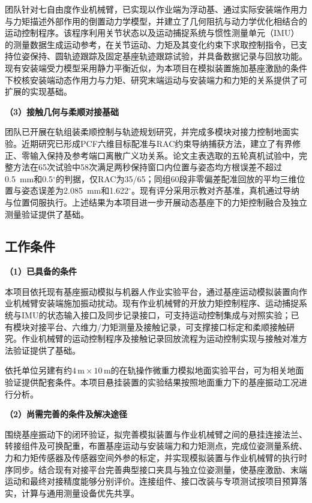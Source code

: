 \documentclass[UTF8,a4paper,zihao=-4,fontset=fandol]{ctexart}
\newcommand{\topic}[1]{\par\addvspace{0.5em}\noindent\textbf{#1}\par\nobreak}
\begin{document}
团队针对七自由度作业机械臂，已实现以作业端为浮动基、通过实际安装端作用力与力矩描述外部作用的倒置动力学模型，并建立了几何阻抗与动力学优化相结合的运动控制程序。该程序利用关节状态以及运动捕捉系统与惯性测量单元（IMU）的测量数据生成运动参考，在关节运动、力矩及其变化约束下求取控制指令，已支持位姿保持、圆轨迹跟踪及固定基座轨迹跟踪试验，并具备数据记录与回放功能。现有安装端受力模型采用静力平衡近似，为本项目在模拟装置施加基座激励的条件下校核安装端动态作用力与力矩、研究末端运动与安装端力和力矩的关系提供了可扩展的实现基础。



\topic{（3）接触几何与柔顺对接基础}

团队已开展在轨组装柔顺控制与轨迹规划研究，并完成多模块对接力控制地面实验\cite{shi2024}。近期研究已形成PCF六维目标配准与RAC约束导纳捕获方法，建立了有界修正、零输入保持及参考端口离散广义功关系。论文主表选取的五轮真机试验中，完整方法在65次试验中58次满足两秒保持窗口内位置与姿态均方根误差不超过0.5~mm和0.5$^\circ$的判据，仅RAC为35/65；同组60段非零偏差配准回放的平均三维位置与姿态误差为2.085~mm和1.622$^\circ$。现有评分采用示教对齐基准，真机通过导纳与位置伺服执行。上述结果为本项目进一步开展动态基座下的力矩控制融合及独立测量验证提供了基础。

\subsection{工作条件}

\topic{（1）已具备的条件}

本项目依托现有基座振动模拟与机器人作业实验平台，通过基座运动模拟装置向作业机械臂安装端施加振动扰动。现有作业机械臂的开放力矩控制程序、运动捕捉系统与IMU的状态输入接口及同步记录接口，可支持运动控制集成与对照实验；已有模块对接平台、六维力/力矩测量及接触记录，可支撑接口标定和柔顺接触研究。作业机械臂的运动控制程序及接触记录回放流程为运动控制实现与接触对准方法验证提供了基础。

依托单位另建有约$4\,\mathrm m\times10\,\mathrm m$的在轨操作微重力模拟地面实验平台，可为相关地面验证提供配套条件。本项目悬挂装置的实验结果按照地面重力下的基座振动工况进行分析。

\topic{（2）尚需完善的条件及解决途径}

围绕基座振动下的闭环验证，拟完善模拟装置与作业机械臂之间的悬挂连接法兰、转接组件及可换配重，布置基座运动与安装端力和力矩测点，完成位姿测量系统、力和力矩传感器及传感器空间外参的标定，并实现模拟装置与作业机械臂的执行时序同步。结合现有对接平台完善典型接口夹具与独立位姿测量，使基座激励、末端运动和最终对接精度能够分别评价。连接组件、接口改装与专项测试按项目预算落实，计算与通用测量设备优先共享。
\end{document}
